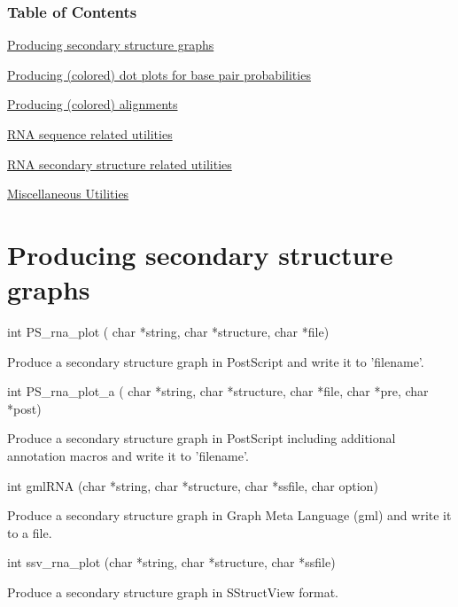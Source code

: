 \label{mp_utils_toc}%
\hypertarget{mp_utils_toc}{}%
 \subsubsection*{Table of Contents}





\begin{DoxyItemize}
\item \hyperlink{mp_utils_utils_ss}{Producing secondary structure graphs} \item \hyperlink{mp_utils_utils_dot}{Producing (colored) dot plots for base pair probabilities} \item \hyperlink{mp_utils_utils_aln}{Producing (colored) alignments} \item \hyperlink{mp_utils_utils_seq}{R\-N\-A sequence related utilities} \item \hyperlink{mp_utils_utils_struc}{R\-N\-A secondary structure related utilities} \item \hyperlink{mp_utils_utils_misc}{Miscellaneous Utilities}\end{DoxyItemize}


\hypertarget{mp_utils_utils_ss}{}\section{Producing secondary structure graphs}\label{mp_utils_utils_ss}
\begin{DoxyVerb}int PS_rna_plot ( char *string,
                  char *structure,
                  char *file)
\end{DoxyVerb}
 Produce a secondary structure graph in Post\-Script and write it to 'filename'.

\begin{DoxyVerb}int PS_rna_plot_a (
            char *string,
            char *structure,
            char *file,
            char *pre,
            char *post)
\end{DoxyVerb}
 Produce a secondary structure graph in Post\-Script including additional annotation macros and write it to 'filename'.

\begin{DoxyVerb}int gmlRNA (char *string,
            char *structure,
            char *ssfile,
            char option)
\end{DoxyVerb}
 Produce a secondary structure graph in Graph Meta Language (gml) and write it to a file.

\begin{DoxyVerb}int ssv_rna_plot (char *string,
                  char *structure,
                  char *ssfile)
\end{DoxyVerb}
 Produce a secondary structure graph in S\-Struct\-View format.

